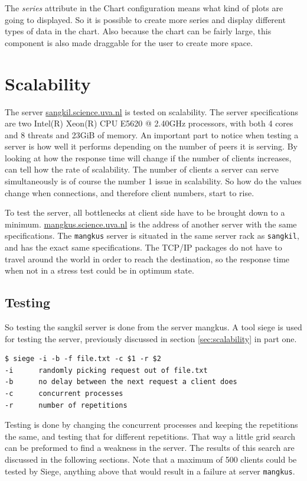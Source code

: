 The \emph{series} attribute in the Chart configuration means what kind of plots are going to displayed. So it is possible to create more series and display different types of data in the chart. Also because the chart can be fairly large, this component is also made draggable for the user to create more space.

\section{Scalability}
The server \url{sangkil.science.uva.nl} is tested on scalability. The server specifications are two Intel(R) Xeon(R) CPU E5620  @ 2.40GHz processors, with both 4 cores and 8 threats and 23GiB of memory. An important part to notice when testing a server is how well it performs depending on the number of peers it is serving. By looking at how the response time will change if the number of clients increases, can tell how the rate of scalability. The number of clients a server can serve simultaneously is of course the number 1 issue in scalability. So how do the values change when connections, and therefore client numbers, start to rise.

To test the server, all bottlenecks at client side have to be brought down to a minimum. \url{mangkus.science.uva.nl} is the address of another server with the same specifications. The \texttt{mangkus} server is situated in the same server rack as \texttt{sangkil}, and has the exact same specifications. The TCP/IP packages do not have to travel around the world in order to reach the destination, so the response time when not in a stress test could be in optimum state. 

\subsection{Testing}
So testing the sangkil server is done from the server mangkus. A tool siege is used for testing the server, previously discussed in section \ref{sec:scalability} in part one.
\begin{lstlisting}
$ siege -i -b -f file.txt -c $1 -r $2
-i		randomly picking request out of file.txt
-b		no delay between the next request a client does
-c		concurrent processes
-r		number of repetitions
\end{lstlisting}

Testing is done by changing the concurrent processes and keeping the repetitions the same, and testing that for different repetitions.  That way a little grid search can be preformed to find a weakness in the server. The results of this search are discussed in the following sections. Note that a maximum of 500 clients could be tested by Siege, anything above that would result in a failure at server \texttt{mangkus}. 

